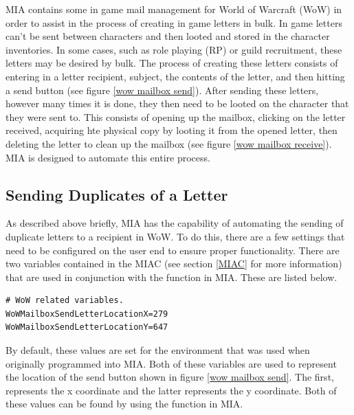 MIA contains some in game mail management for World of Warcraft (WoW) in order to assist in the process of creating in game letters in bulk. In game letters can't be sent between characters and then looted and stored in the character inventories. In some cases, such as role playing (RP) or guild recruitment, these letters may be desired by bulk. The process of creating these letters consists of entering in a letter recipient, subject, the contents of the letter, and then hitting a send button (see figure \ref{wow mailbox send}). After sending these letters, however many times it is done, they then need to be looted on the character that they were sent to. This consists of opening up the mailbox, clicking on the letter received, acquiring hte physical copy by looting it from the opened letter, then deleting the letter to clean up the mailbox (see figure \ref{wow mailbox receive}). MIA is designed to automate this entire process.

\subsection{Sending Duplicates of a Letter}

As described above briefly, MIA has the capability of automating the sending of duplicate letters to a recipient in WoW. To do this, there are a few settings that need to be configured on the user end to ensure proper functionality. There are two variables contained in the MIAC (see section \ref{MIAC} for more information) that are used in conjunction with the  function in MIA. These are listed below.

\begin{lstlisting}
# WoW related variables.
WoWMailboxSendLetterLocationX=279
WoWMailboxSendLetterLocationY=647
\end{lstlisting}

By default, these values are set for the environment that was used when originally programmed into MIA. Both of these variables are used to represent the location of the send button shown in figure \ref{wow mailbox send}. The first,  represents the x coordinate and the latter  represents the y coordinate. Both of these values can be found by using the  function in MIA. 

